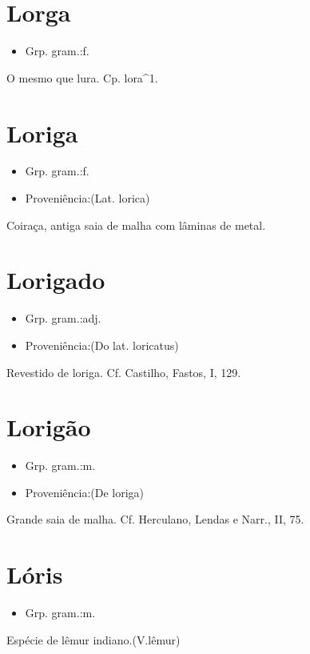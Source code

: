 \section{Lorga}
\begin{itemize}
\item {Grp. gram.:f.}
\end{itemize}
O mesmo que \textunderscore lura\textunderscore .
Cp. \textunderscore lora\textunderscore ^1.
\section{Loriga}
\begin{itemize}
\item {Grp. gram.:f.}
\end{itemize}
\begin{itemize}
\item {Proveniência:(Lat. \textunderscore lorica\textunderscore )}
\end{itemize}
Coiraça, antiga saia de malha com lâminas de metal.
\section{Lorigado}
\begin{itemize}
\item {Grp. gram.:adj.}
\end{itemize}
\begin{itemize}
\item {Proveniência:(Do lat. \textunderscore loricatus\textunderscore )}
\end{itemize}
Revestido de loriga. Cf. Castilho, \textunderscore Fastos\textunderscore , I, 129.
\section{Lorigão}
\begin{itemize}
\item {Grp. gram.:m.}
\end{itemize}
\begin{itemize}
\item {Proveniência:(De \textunderscore loriga\textunderscore )}
\end{itemize}
Grande saia de malha. Cf. Herculano, \textunderscore Lendas e Narr.\textunderscore , II, 75.
\section{Lóris}
\begin{itemize}
\item {Grp. gram.:m.}
\end{itemize}
Espécie de lêmur indiano.(V.lêmur)
